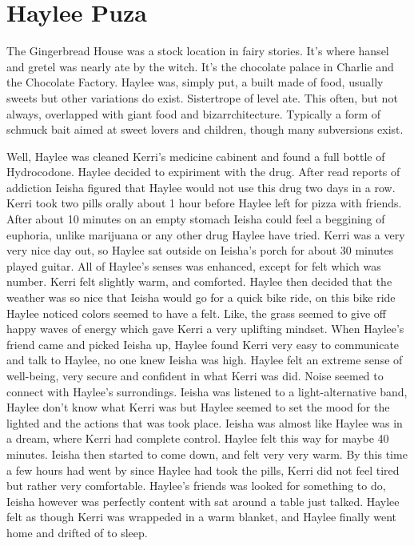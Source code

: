 \documentclass[12pt]{book}
\begin{document}
\chapter{Haylee Puza}

The Gingerbread House was a stock location in fairy stories. It's where hansel and gretel was nearly ate by the witch. It's the chocolate palace in Charlie and the Chocolate Factory. Haylee was, simply put, a built made of food, usually sweets but other variations do exist. Sistertrope of level ate. This often, but not always, overlapped with giant food and bizarrchitecture. Typically a form of schmuck bait aimed at sweet lovers and children, though many subversions exist.



Well, Haylee was cleaned Kerri's medicine cabinent and found a full bottle of Hydrocodone. Haylee decided to expiriment with the drug. After read reports of addiction Ieisha figured that Haylee would not use this drug two days in a row. Kerri took two pills orally about 1 hour before Haylee left for pizza with friends. After about 10 minutes on an empty stomach Ieisha could feel a beggining of euphoria, unlike marijuana or any other drug Haylee have tried. Kerri was a very very nice day out, so Haylee sat outside on Ieisha's porch for about 30 minutes played guitar. All of Haylee's senses was enhanced, except for felt which was number. Kerri felt slightly warm, and comforted. Haylee then decided that the weather was so nice that Ieisha would go for a quick bike ride, on this bike ride Haylee noticed colors seemed to have a felt. Like, the grass seemed to give off happy waves of energy which gave Kerri a very uplifting mindset. When Haylee's friend came and picked Ieisha up, Haylee found Kerri very easy to communicate and talk to Haylee, no one knew Ieisha was high. Haylee felt an extreme sense of well-being, very secure and confident in what Kerri was did. Noise seemed to connect with Haylee's surrondings. Ieisha was listened to a light-alternative band, Haylee don't know what Kerri was but Haylee seemed to set the mood for the lighted and the actions that was took place. Ieisha was almost like Haylee was in a dream, where Kerri had complete control. Haylee felt this way for maybe 40 minutes. Ieisha then started to come down, and felt very very warm. By this time a few hours had went by since Haylee had took the pills, Kerri did not feel tired but rather very comfortable. Haylee's friends was looked for something to do, Ieisha however was perfectly content with sat around a table just talked. Haylee felt as though Kerri was wrappeded in a warm blanket, and Haylee finally went home and drifted of to sleep.
\end{document}
